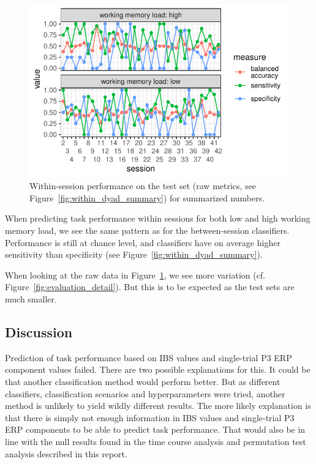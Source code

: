 \begin{figure}[!htpb]
  \includegraphics[width=\linewidth]{../stats/results/within_dyad_detail.pdf}
  \caption{Within-session performance on the test set (raw metrics, see Figure~\ref{fig:within_dyad_summary}) for summarized numbers.}
  \label{fig:within_dyad_detail}
\end{figure}

When predicting task performance within sessions for both low and high working
memory load, we see the same pattern as for the between-session classifiers.
Performance is still at chance level, and classifiers have on average higher
sensitivity than specificity (see Figure~\ref{fig:within_dyad_summary}).

When looking at the raw data in Figure~\ref{fig:within_dyad_detail}, we see
more variation (cf. Figure~\ref{fig:evaluation_detail}). But this is to be
expected as the test sets are much smaller.

\subsection{Discussion}

Prediction of task performance based on IBS values and single-trial
P3 ERP component values failed. There are two possible explanations for this.
It could be that another classification method would perform better. But as
different classifiers, classification scenarios and hyperparameters were tried,
another method is unlikely to yield wildly different results. The more likely
explanation is that there is simply not enough information in
IBS values and single-trial P3 ERP components to be able to predict task
performance. That would also be in line with the null results found in the time
course analysis and permutation test analysis described in this report.

